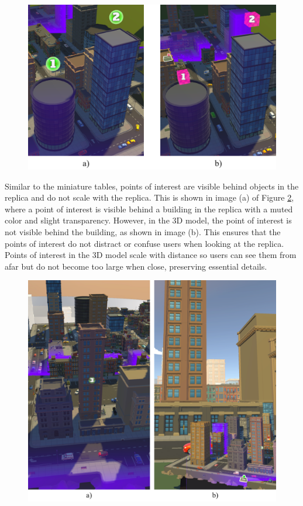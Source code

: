         \begin{figure}[h!]
            \centering
            \includegraphics[width=.8\textwidth]{figures/poi_appearance.png}
            \label{fig:poi_appearance}
        \end{figure}

        Similar to the miniature tables, points of interest are visible behind objects in the replica and do not scale with the replica. This is shown in image (a) of Figure \ref{fig:poi_visibility}, where a point of interest is visible behind a building in the replica with a muted color and slight transparency. However, in the 3D model, the point of interest is not visible behind the building, as shown in image (b). This ensures that the points of interest do not distract or confuse users when looking at the replica. Points of interest in the 3D model scale with distance so users can see them from afar but do not become too large when close, preserving essential details.

       \begin{figure}[h!]
            \centering
            \includegraphics[width=.8\textwidth]{figures/poi_visibility.png}
            \label{fig:poi_visibility}
        \end{figure}

